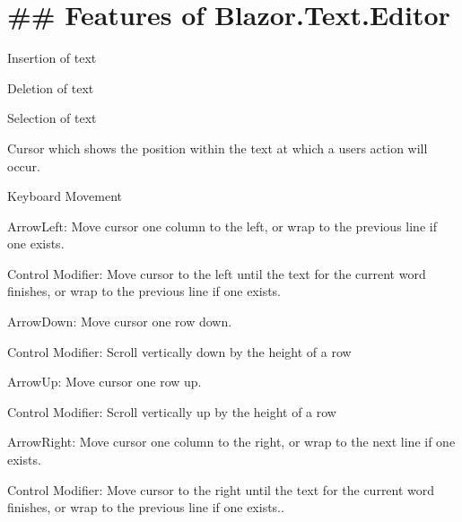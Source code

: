 \chapter{\#\# Features of {\ttfamily Blazor.\+Text.\+Editor} }
\hypertarget{md__docs_2_text_editor_2features}{}\label{md__docs_2_text_editor_2features}

\begin{DoxyItemize}
\item {\ttfamily Insertion} of text
\item {\ttfamily Deletion} of text
\item {\ttfamily Selection} of text
\item {\ttfamily Cursor} which shows the position within the text at which a user\textquotesingle{}s action will occur.
\item {\ttfamily Keyboard Movement}
\begin{DoxyItemize}
\item {\ttfamily Arrow\+Left}\+: Move cursor one column to the left, or wrap to the previous line if one exists.
\begin{DoxyItemize}
\item {\ttfamily Control Modifier}\+: Move cursor to the left until the text for the current word finishes, or wrap to the previous line if one exists.
\end{DoxyItemize}
\item {\ttfamily Arrow\+Down}\+: Move cursor one row down.
\begin{DoxyItemize}
\item {\ttfamily Control Modifier}\+: Scroll vertically down by the height of a row
\end{DoxyItemize}
\item {\ttfamily Arrow\+Up}\+: Move cursor one row up.
\begin{DoxyItemize}
\item {\ttfamily Control Modifier}\+: Scroll vertically up by the height of a row
\end{DoxyItemize}
\item {\ttfamily Arrow\+Right}\+: Move cursor one column to the right, or wrap to the next line if one exists.
\begin{DoxyItemize}
\item {\ttfamily Control Modifier}\+: Move cursor to the right until the text for the current word finishes, or wrap to the previous line if one exists..
\end{DoxyItemize}

\end{DoxyItemize}
\end{DoxyItemize}
